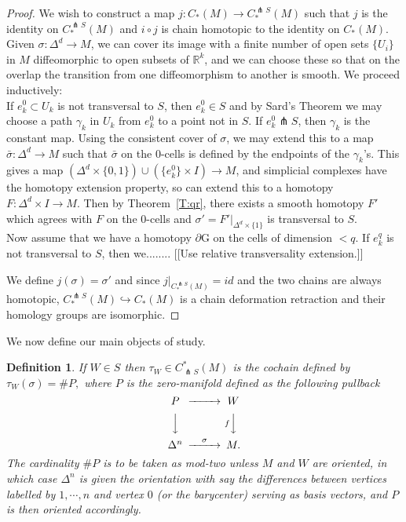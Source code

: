 \documentclass{amsart}          %
\newtheorem{definition}[theorem]{Definition}
\newcommand{\R}{\mathbb R}
\begin{document}
\begin{proof} We wish to construct a map $j:C_{*}(M) \rightarrow C^{\pitchfork S}_{*}(M)$ such that $j$ is the identity on $C^{\pitchfork S}_{*}(M)$ and 
$i \circ j$ is chain homotopic to the identity on $C_{*}(M)$. Given $\sigma:\Delta^d \rightarrow M$, we can cover its image with a finite number of 
open sets $\{U_i\}$ in $M$ diffeomorphic to open subsets of $\R^k$, and we can choose these so that on the overlap the transition from one 
diffeomorphism to another is smooth. We proceed inductively: \\If $e^0_k \subset U_k$ is not transversal to $S$, then $e^0_k \in S$ and by 
Sard's Theorem we may choose a path $\gamma_k$ in $U_k$ from $e^0_k$ to a point not in $S$. If $e^0_k \pitchfork S$, then $\gamma_k$ is the 
constant map. Using the consistent cover of $\sigma$, we may extend this to a map $\bar{\sigma}:\Delta^d \rightarrow M$ such that $\bar{\sigma}$ 
on the 0-cells is defined by the endpoints of the $\gamma_k$'s. This gives a map 
$\left(\Delta^d \times \{0,1\} \right)\cup \left(\{e^0_k\} \times I \right)\rightarrow M$, and simplicial complexes have the homotopy extension property, 
so can extend this to a homotopy $F: \Delta^d \times I \rightarrow M$. Then by Theorem~\ref{T:qr}, there exists a smooth homotopy $F'$ which 
agrees with $F$ on the 0-cells and $\sigma'=\left.F'\right|_{\Delta^d \times \{1\}}$ is transversal to $S$.\\
Now assume that we have a homotopy $\partial$G on the cells of dimension $<q$. If $e^q_k $ is not transversal to $S$, then we........  
[[Use relative transversality
extension.]]


We define $j(\sigma) = \sigma'$ and since $\left.j\right|_{C^{\pitchfork S}_{*}(M)}=id$ and the two chains are always homotopic, $C^{\pitchfork S}_{*}(M) \hookrightarrow C_{*}(M)$ is a chain deformation retraction and their homology groups are isomorphic.
\end{proof}

We now define our main objects of study.
\begin{definition}
If $W \in S$ then $\tau_{W} \in C^{*}_{\pitchfork S}(M)$ is the cochain defined by $\tau_W (\sigma) = \# P,$  where $P$ is
the  zero-manifold defined as the following pullback
$$
\begin{CD}
P @>>> W\\
@VVV  @VfVV\\
\Delta^n @>\sigma>> M.
\end{CD}
$$
The cardinality $\# P$ is to be taken as mod-two unless $M$ and $W$ are oriented, in which case $\Delta^n$ is given the  orientation with say the differences between vertices labelled by $1, \cdots, n$ and vertex $0$ (or the barycenter) serving as basis vectors, and $P$ is then oriented accordingly.
\end{definition}
\end{document}
